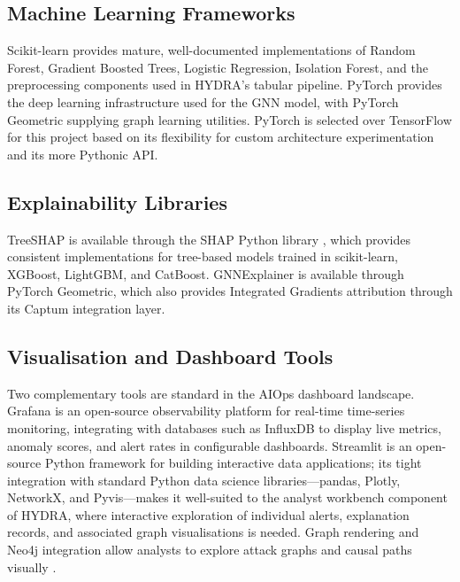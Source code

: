 \documentclass[12pt,a4paper]{report}
\begin{document}
\subsection{Machine Learning Frameworks}
\label{sec:ml-frameworks}

Scikit-learn \citep{pedregosa2011} provides mature, well-documented implementations of Random Forest, Gradient Boosted Trees, Logistic Regression, Isolation Forest, and the preprocessing components used in HYDRA's tabular pipeline. PyTorch \citep{paszke2019} provides the deep learning infrastructure used for the GNN model, with PyTorch Geometric \citep{fey2019} supplying graph learning utilities. PyTorch is selected over TensorFlow for this project based on its flexibility for custom architecture experimentation and its more Pythonic API.

\subsection{Explainability Libraries}
\label{sec:xai-libs}

TreeSHAP is available through the SHAP Python library \citep{lundberg2022}, which provides consistent implementations for tree-based models trained in scikit-learn, XGBoost, LightGBM, and CatBoost. GNNExplainer is available through PyTorch Geometric, which also provides Integrated Gradients attribution through its Captum integration layer.

\subsection{Visualisation and Dashboard Tools}
\label{sec:viz}

Two complementary tools are standard in the AIOps dashboard landscape. Grafana \citep{grafana2023} is an open-source observability platform for real-time time-series monitoring, integrating with databases such as InfluxDB to display live metrics, anomaly scores, and alert rates in configurable dashboards. Streamlit \citep{streamlit2023} is an open-source Python framework for building interactive data applications; its tight integration with standard Python data science libraries---pandas, Plotly, NetworkX, and Pyvis---makes it well-suited to the analyst workbench component of HYDRA, where interactive exploration of individual alerts, explanation records, and associated graph visualisations is needed. Graph rendering and Neo4j integration allow analysts to explore attack graphs and causal paths visually \citep{robinson2015}.
\end{document}
